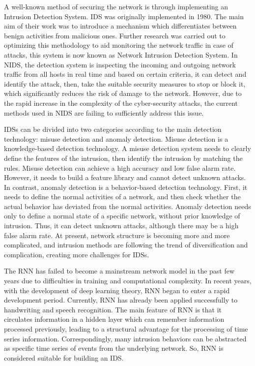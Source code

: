 \par
A well-known method of securing the network is through implementing an Intrusion Detection System. IDS was originally implemented in 1980. The main aim of their work was to introduce a mechanism which differentiates between benign activities from malicious ones. Further research was carried out to optimizing this methodology to aid monitoring the network traffic in case of attacks, this system is now known as Network Intrusion Detection System. In NIDS, the detection system is inspecting the incoming and outgoing network traffic from all hosts in real time and based on certain criteria, it can detect and identify the attack, then, take the suitable security measures to stop or block it, which significantly reduces the risk of damage to the network. However, due to the rapid increase in the complexity of the cyber-security attacks, the current methods used in NIDS are failing to sufficiently address this issue\cite{al2020using}.
\par 
IDSs can be divided into two categories according to the main detection technology: misuse detection and anomaly detection. Misuse detection is a knowledge-based detection technology. A misuse detection system needs to clearly define the features of the intrusion, then identify the intrusion by matching the rules. Misuse detection can achieve a high accuracy and low false alarm rate. However, it needs to build a feature library and cannot detect unknown attacks. In contrast, anomaly detection is a behavior-based detection technology. First, it needs to define the normal activities of a network, and then check whether the actual behavior has deviated from the normal activities. Anomaly detection needs only to define a normal state of a specific network, without prior knowledge of intrusion. Thus, it can detect unknown attacks, although there may be a high false alarm rate. At present, network structure is becoming more and more complicated, and intrusion methods are following the trend of diversification and complication, creating more challenges for IDSs.\par 
The RNN has failed to become a mainstream network model in the past few years due to difficulties in training and computational complexity. In recent years, with the development of deep learning theory, RNN began to enter a rapid development period. Currently, RNN has already been applied successfully to handwriting and speech recognition. The main feature of RNN is that it circulates information in a hidden layer which can remember information processed previously, leading to a structural advantage for the processing of time series information. Correspondingly, many intrusion behaviors can be abstracted as specific time series of events from the underlying network. So, RNN is considered suitable for building an IDS\cite{xu2018intrusion}.
\par 
